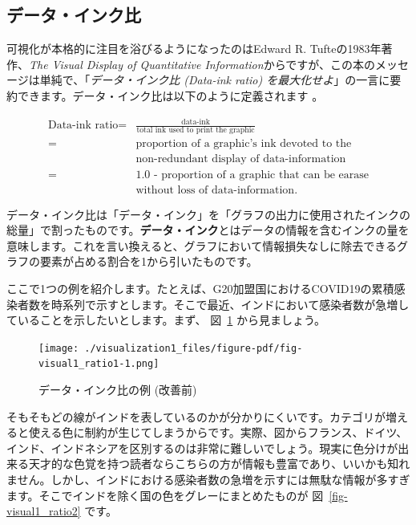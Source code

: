 \documentclass[
  a4paper,
  pandoc,
  ja=standard,
  jafont=haranoaji]{bxjsbook}
\begin{document}
\hypertarget{ux30c7ux30fcux30bfux30a4ux30f3ux30afux6bd4}{%
\subsection{データ・インク比}\label{ux30c7ux30fcux30bfux30a4ux30f3ux30afux6bd4}}

可視化が本格的に注目を浴びるようになったのはEdward R.
Tufteの1983年著作、\emph{The Visual Display of Quantitative
Information}からですが、この本のメッセージは単純で、「\emph{データ・インク比
(Data-ink ratio)
を最大化せよ}」の一言に要約できます。データ・インク比は以下のように定義されます
\citep{Tufte:2001}。

\begin{align}
\text{Data-ink ratio} = & \frac{\text{data-ink}}{\text{total ink used to print the graphic}} \\
= & \text{proportion of a graphic's ink devoted to the} \\
  & \text{non-redundant display of data-information} \\
= & \text{1.0 - proportion of a graphic that can be earase} \\
  & \text{without loss of data-information.}
\end{align}

データ・インク比は「データ・インク」を「グラフの出力に使用されたインクの総量」で割ったものです。\textbf{データ・インク}とはデータの情報を含むインクの量を意味します。これを言い換えると、グラフにおいて情報損失なしに除去できるグラフの要素が占める割合を1から引いたものです。

ここで1つの例を紹介します。たとえば、G20加盟国におけるCOVID19の累積感染者数を時系列で示すとします。そこで最近、インドにおいて感染者数が急増していることを示したいとします。まず、
図~\ref{fig-visual1_ratio1} から見ましょう。

\begin{figure}

{\centering \texttt{[image: ./visualization1\_files/figure-pdf/fig-visual1\_ratio1-1.png]}

}

\caption{\label{fig-visual1_ratio1}データ・インク比の例 (改善前)}

\end{figure}

そもそもどの線がインドを表しているのかが分かりにくいです。カテゴリが増えると使える色に制約が生じてしまうからです。実際、図からフランス、ドイツ、インド、インドネシアを区別するのは非常に難しいでしょう。現実に色分けが出来る天才的な色覚を持つ読者ならこちらの方が情報も豊富であり、いいかも知れません。しかし、インドにおける感染者数の急増を示すには無駄な情報が多すぎます。そこでインドを除く国の色をグレーにまとめたものが
図~\ref{fig-visual1_ratio2} です。
\end{document}
